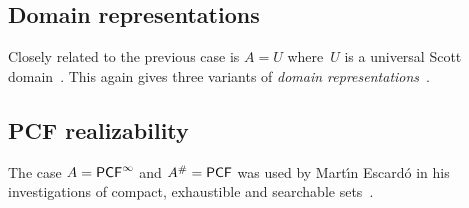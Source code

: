 \subsection{Domain representations}
\label{sec:domain-representations}


Closely related to the previous case is $A = U$ where~$U$ is a
universal Scott domain~\cite{GunterScott}. This again gives three
variants of \emph{domain representations}~\cite{Bla97,Bla97a}.


\subsection{PCF realizability}
\label{sec:pcf-realizability}

The case $A = \mathsf{PCF}^\infty$ and $A^{\#} = \mathsf{PCF}$ was used by
Mart{\'\i}n Escard\'o in his investigations of compact, exhaustible
and searchable sets~\cite{Escardo}.





